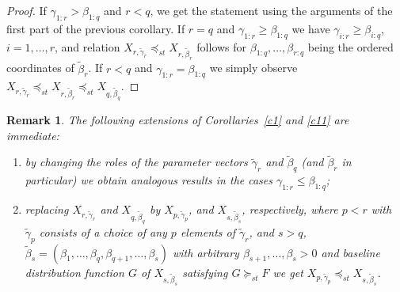 \documentclass [11pt]{article}
\newtheorem{remark}{Remark}
\newcommand{\gos}{GOS}
\begin{document}
\begin{proof} If $\gamma_{1:r} > \beta_{1:q}$ and $r < q$, we get the statement using the arguments of the first part of the previous corollary. If $r=q$ and $\gamma_{1:r} \geq \beta_{1:q}$ we have $\gamma_{i:r} \geq \beta_{i:q}$, $i=1,\ldots,r$, and relation 
$X_{r, \tilde{\gamma}_r} \preceq_{st} X_{r,\tilde{\beta}_r}$  follows for $\beta_{1:q}, \ldots,\beta_{r:q}$ being the ordered coordinates of 
$\tilde{\beta}_r$. If $r<q$ and $\gamma_{1:r} = \beta_{1:q}$ we simply observe $X_{r, \tilde{\gamma}_r} \preceq_{st} X_{r,\tilde{\beta}_r} \preceq_{st} X_{q,\tilde{\beta}_q}$.
\end{proof}


\begin{remark}\label{rem1}
The following extensions of Corollaries~\ref{c1} and \ref{c11} are immediate:
    \begin{enumerate}
    \item
    by changing the roles of the parameter vectors $\tilde{\gamma}_r$ and $\tilde{\beta}_q$ (and $\tilde{\beta}_r$ in particular) we obtain analogous results in the cases $\gamma_{1:r} \leq \beta_{1:q}$;
    
    \item
    replacing $X_{r, \tilde{\gamma}_r}$ and $X_{q,\tilde{\beta}_q}$ by $X_{p,\tilde{\gamma}_p}$, and $X_{s,\tilde{\beta}_s}$, respectively, where $p<r$ with $\tilde{\gamma}_p$ consists of a choice of any $p$ elements of $\tilde{\gamma}_r$, and $s>q$, 
    $\tilde{\beta}_s=(\beta_1, \ldots, \beta_q, \beta_{q+1}, \ldots, \beta_s)$ with arbitrary $\beta_{s+1},\ldots,\beta_s>0$ and baseline distribution function $G$ of $X_{s,\tilde{\beta}_s}$ satisfying $G \succeq_{st} F$ we get $X_{p,\tilde{\gamma}_p} 
    \preceq_{st} X_{s, \tilde{\beta}_s}$.
    \end{enumerate}
\end{remark}

\end{document}
